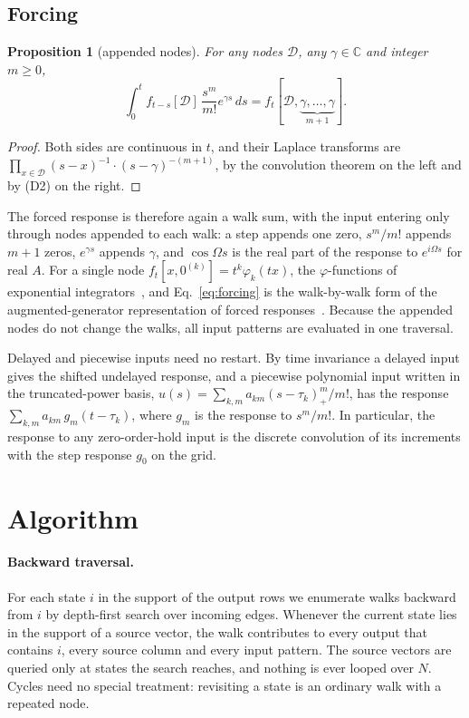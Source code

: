 \documentclass[aps,pra,superscriptaddress,floatfix,longbibliography,twocolumn]{revtex4-2}
\newtheorem{proposition}{Proposition}
\begin{document}
\subsection{Forcing}
\begin{proposition}[appended nodes]\label{prop:forcing}
For any nodes $\mathcal{D}$, any $\gamma\in\mathbb{C}$ and integer $m\ge0$,
\begin{equation}\label{eq:forcing}
\int_0^t f_{t-s}[\mathcal{D}]\,\frac{s^m}{m!}e^{\gamma s}\,ds=f_t[\mathcal{D},\underbrace{\gamma,\dots,\gamma}_{m+1}].
\end{equation}
\end{proposition}
\begin{proof}
Both sides are continuous in $t$, and their Laplace transforms are $\prod_{x\in\mathcal{D}}(s-x)^{-1}\cdot(s-\gamma)^{-(m+1)}$, by the convolution theorem on the left and by (D2) on the right.
\end{proof}
The forced response is therefore again a walk sum, with the input entering only through nodes appended to each walk: a step appends one zero, $s^m/m!$ appends $m+1$ zeros, $e^{\gamma s}$ appends $\gamma$, and $\cos\Omega s$ is the real part of the response to $e^{i\Omega s}$ for real $A$. For a single node $f_t[x,0^{(k)}]=t^k\varphi_k(tx)$, the $\varphi$-functions of exponential integrators~\cite{hochbruck2010,niesen2012}, and Eq.~\eqref{eq:forcing} is the walk-by-walk form of the augmented-generator representation of forced responses~\cite{vanloan1978,almohy2011}. Because the appended nodes do not change the walks, all input patterns are evaluated in one traversal.

Delayed and piecewise inputs need no restart. By time invariance a delayed input gives the shifted undelayed response, and a piecewise polynomial input written in the truncated-power basis, $u(s)=\sum_{k,m}a_{km}(s-\tau_k)_+^m/m!$, has the response $\sum_{k,m}a_{km}\,g_m(t-\tau_k)$, where $g_m$ is the response to $s^m/m!$. In particular, the response to any zero-order-hold input is the discrete convolution of its increments with the step response $g_0$ on the grid.

\section{Algorithm}\label{sec:algorithm}

\paragraph*{Backward traversal.} For each state $i$ in the support of the output rows we enumerate walks backward from $i$ by depth-first search over incoming edges. Whenever the current state lies in the support of a source vector, the walk contributes to every output that contains $i$, every source column and every input pattern. The source vectors are queried only at states the search reaches, and nothing is ever looped over $N$. Cycles need no special treatment: revisiting a state is an ordinary walk with a repeated node.
\end{document}
